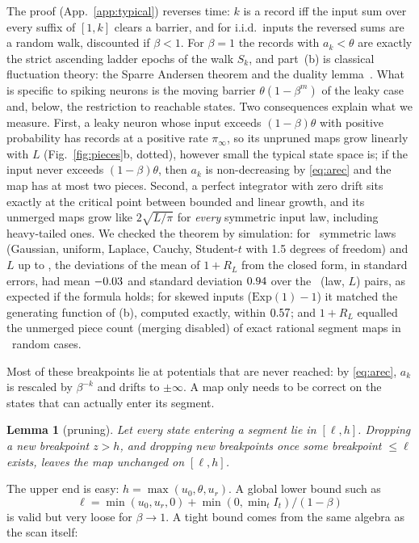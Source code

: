 \documentclass[10pt]{article}
\newtheorem{lemma}[theorem]{Lemma}
\theoremstyle{remark}
\begin{document}
The proof (App.~\ref{app:typical}) reverses time: $k$ is a record iff the input sum over every suffix of $[1,k]$ clears a barrier, and for i.i.d.\ inputs the reversed sums are a random walk, discounted if $\beta<1$. For $\beta=1$ the records with $a_k<\theta$ are exactly the strict ascending ladder epochs of the walk $S_k$, and part~(b) is classical fluctuation theory: the Sparre Andersen theorem and the duality lemma~\citep{sparreandersen1954,feller1971}. What is specific to spiking neurons is the moving barrier $\theta(1-\beta^m)$ of the leaky case and, below, the restriction to reachable states. Two consequences explain what we measure. First, a leaky neuron whose input exceeds $(1-\beta)\theta$ with positive probability has records at a positive rate $\pi_\infty$, so its unpruned maps grow linearly with $L$ (Fig.~\ref{fig:pieces}b, dotted), however small the typical state space is; if the input never exceeds $(1-\beta)\theta$, then $a_k$ is non-decreasing by \eqref{eq:arec} and the map has at most two pieces. Second, a perfect integrator with zero drift sits exactly at the critical point between bounded and linear growth, and its unmerged maps grow like $2\sqrt{L/\pi}$ for \emph{every} symmetric input law, including heavy-tailed ones. We checked the theorem by simulation: for \TypLaws\ symmetric laws (Gaussian, uniform, Laplace, Cauchy, Student-$t$ with 1.5 degrees of freedom) and $L$ up to \TypLmax, the deviations of the mean of $1+R_L$ from the closed form, in standard errors, had mean $-0.03$ and standard deviation $0.94$ over the \TypZN\ (law, $L$) pairs, as expected if the formula holds; for skewed inputs ($\mathrm{Exp}(1)-1$) it matched the generating function of (b), computed exactly, within $0.57$; and $1+R_L$ equalled the unmerged piece count (merging disabled) of exact rational segment maps in \TypExactCases\ random cases.

Most of these breakpoints lie at potentials that are never reached: by \eqref{eq:arec}, $a_k$ is rescaled by $\beta^{-k}$ and drifts to $\pm\infty$. A map only needs to be correct on the states that can actually enter its segment.

\begin{lemma}[pruning]
Let every state entering a segment lie in $[\ell,h]$. Dropping a new breakpoint $z>h$, and dropping new breakpoints once some breakpoint $\le\ell$ exists, leaves the map unchanged on $[\ell,h]$.
\end{lemma}

The upper end is easy: $h=\max(u_0,\theta,u_r)$. A global lower bound such as\[\ell=\min(u_0,u_r,0)+\min(0,\min\nolimits_tI_t)/(1-\beta)\]is valid but very loose for $\beta\to1$. A tight bound comes from the same algebra as the scan itself:
\end{document}
